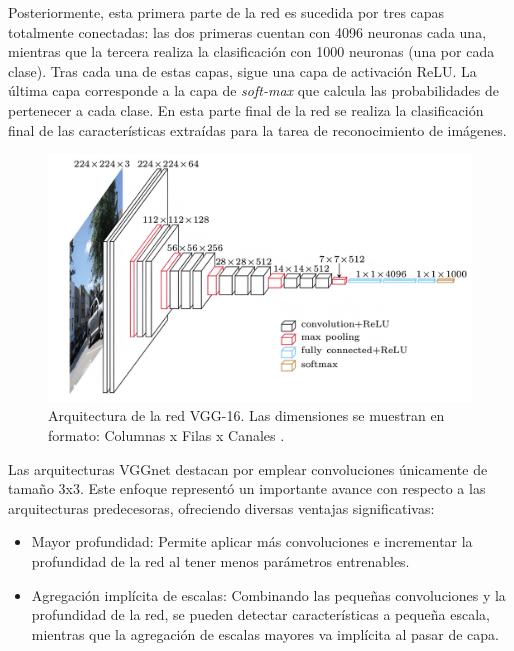 Posteriormente, esta primera parte de la red es sucedida por tres capas totalmente conectadas: las dos primeras cuentan con 4096 neuronas cada una, mientras que la tercera realiza la clasificación con 1000 neuronas (una por cada clase). Tras cada una de estas capas, sigue una capa de activación ReLU. La última capa corresponde a la capa de \textit{soft-max} que calcula las probabilidades de pertenecer a cada clase. En esta parte final de la red se realiza la clasificación final de las características extraídas para la tarea de reconocimiento de imágenes.

\begin{figure}[h]
	\centering
	\includegraphics[scale=0.1]{imagenes/cap4/vgg-16.png}
	\caption[Arquitectura de la red VGG-16.]{Arquitectura de la red VGG-16. Las dimensiones se muestran en formato: Columnas x Filas x Canales \cite{66}.}
	\label{fig26}
\end{figure}

Las arquitecturas VGGnet destacan por emplear convoluciones únicamente de tamaño 3x3. Este enfoque representó un importante avance con respecto a las arquitecturas predecesoras, ofreciendo diversas ventajas significativas:

\begin{itemize}
	\item Mayor profundidad: Permite aplicar más convoluciones e incrementar la profundidad de la red al tener menos parámetros entrenables.
	\item Agregación implícita de escalas: Combinando las pequeñas convoluciones y la profundidad de la red, se pueden detectar características a pequeña escala, mientras que la agregación de escalas mayores va implícita al pasar de capa.
\end{itemize}

